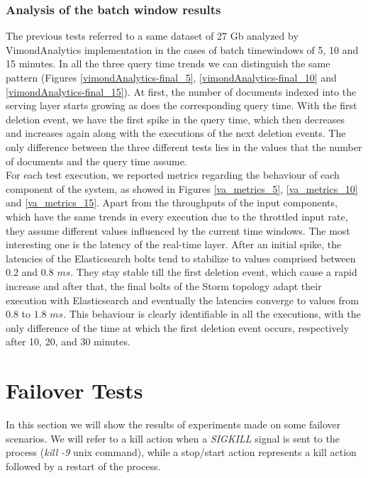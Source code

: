 \subsubsection{Analysis of the batch window results}

The previous tests referred to a same dataset of 27 Gb analyzed by VimondAnalytics implementation in the cases of batch timewindows of 5, 10 and 15 minutes. In all the three query time trends we can distinguish the same pattern (Figures \ref{vimondAnalytics-final_5}, \ref{vimondAnalytics-final_10} and \ref{vimondAnalytics-final_15}). At first, the number of documents indexed into the serving layer starts growing as does the corresponding query time. With the first deletion event, we have the first spike in the query time, which then decreases and increases again along with the executions of the next deletion events. The only difference between the three different tests lies in the values that the number of documents and the query time assume.\\
For each test execution, we reported metrics regarding the behaviour of each component of the system, as showed in Figures \ref{va_metrics_5}, \ref{va_metrics_10} and \ref{va_metrics_15}. Apart from the throughputs of the input components, which have the same trends in every execution due to the throttled input rate, they assume different values influenced by the current time windows. The most interesting one is the latency of the real-time layer. After an initial spike, the latencies of the Elasticsearch bolts tend to stabilize to values comprised between $0.2$ and $0.8$ $ms$. They stay stable till the first deletion event, which cause a rapid increase and after that, the final bolts of the Storm topology adapt their execution with Elasticsearch and eventually the latencies converge to values from $0.8$ to $1.8$ $ms$. This behaviour is clearly identifiable in all the executions, with the only difference of the time at which the first deletion event occurs, respectively after 10, 20, and 30 minutes.

\section{Failover Tests}
In this section we will show the results of experiments made on some failover scenarios. We will refer to a kill action when a \textit{SIGKILL} signal is sent to the process (\textit{kill -9} unix command), while a stop/start action represents a kill action followed by a restart of the process.

